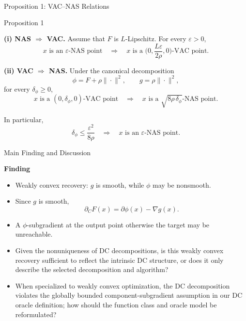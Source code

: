 \documentclass[10pt]{beamer}
\begin{document}
\begin{frame}{Proposition 1: VAC--NAS Relations}
\footnotesize

\begin{block}{Proposition 1}
\medskip

\textbf{(i) NAS $\Longrightarrow$ VAC.}
Assume that $F$ is $L$-Lipschitz. For every $\varepsilon>0$,
\[
   x\text{ is an }\varepsilon\text{-NAS point}
   \quad\Longrightarrow\quad
   x\text{ is a }
   \biggl(0,\frac{L\varepsilon}{2\rho},0\biggr)\text{-VAC point}.
\]

\medskip

\textbf{(ii) VAC $\Longrightarrow$ NAS.}
Under the canonical decomposition
\[
   \phi=F+\rho\|\cdot\|^2,
   \qquad
   g=\rho\|\cdot\|^2,
\]
for every $\delta_\phi\ge0$,
\[
   x\text{ is a }(0,\delta_\phi,0)\text{-VAC point}
   \quad\Longrightarrow\quad
   x\text{ is a }\sqrt{8\rho\,\delta_\phi}\text{-NAS point}.
\]

In particular,
\[
   \delta_\phi\le\frac{\varepsilon^2}{8\rho}
   \quad\Longrightarrow\quad
   x\text{ is an }\varepsilon\text{-NAS point}.
\]
\end{block}
\end{frame}

\begin{frame}{Main Finding and Discussion}
\small

\textbf{Finding}
\begin{itemize}\setlength{\itemsep}{3pt}
    \item Weakly convex recovery: $g$ is smooth, while $\phi$ may be
    nonsmooth.
    \item Since $g$ is smooth,
    \[
        \partial_C F(x)=\partial\phi(x)- \nabla g(x).
    \]
        \item A $\phi$-subgradient at the output point  otherwise the
    target may be unreachable.
\end{itemize}

\medskip
{}
\begin{itemize}\setlength{\itemsep}{3pt}
    \item Given the nonuniqueness of DC decompositions, is this 
    weakly convex recovery sufficient to reflect the intrinsic DC structure,
    or does it only describe the selected decomposition and algorithm?

    \item  When specialized to weakly convex optimization, the DC decomposition violates the globally bounded component-subgradient assumption in our DC oracle definition; how should the function class and oracle model be reformulated?
\end{itemize}
\end{frame}
\end{document}
